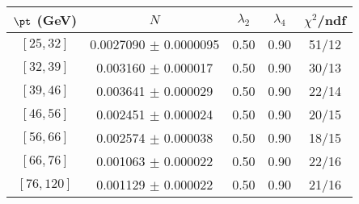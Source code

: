 \begin{tabular}{c||c|c|c|c}
$\pt$ (GeV) & $N$ & $\lambda_{2}$ & $\lambda_4$  & $\chi^2$/ndf  \\
\hline
$[25, 32]$ & 0.0027090 $\pm$ 0.0000095 & 0.50 & 0.90 & 51/12\\
$[32, 39]$ & 0.003160 $\pm$ 0.000017 & 0.50 & 0.90 & 30/13\\
$[39, 46]$ & 0.003641 $\pm$ 0.000029 & 0.50 & 0.90 & 22/14\\
$[46, 56]$ & 0.002451 $\pm$ 0.000024 & 0.50 & 0.90 & 20/15\\
$[56, 66]$ & 0.002574 $\pm$ 0.000038 & 0.50 & 0.90 & 18/15\\
$[66, 76]$ & 0.001063 $\pm$ 0.000022 & 0.50 & 0.90 & 22/16\\
$[76, 120]$ & 0.001129 $\pm$ 0.000022 & 0.50 & 0.90 & 21/16\\
\end{tabular}
